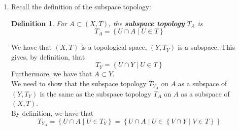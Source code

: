 \documentclass{article}
\newcommand{\sth}{\mathrm{s.th}\ }
\newcommand{\R}{\mathbb{R}}
\newcommand{\cts}{cts. }
\newcommand{\ba}{\mathcal{B}}
\newtheorem{sdefinition}[stheorem]{Definition}
\theoremstyle{remark}
\theoremstyle{example}
\theoremstyle{examples}
\begin{document}
\begin{enumerate}
\begin{enumerate}
			\item Recall the definition of continuity in this context:
			\begin{framed}
				\setcounter{theorem}{3}
				\setcounter{stheorem}{0}
				\begin{sdefinition}
					A map $f:(X,T) \to (Y, T')$ is \textbf{continuous} if $\forall V \in T'$ the pre-image $f^{-1}(V) \in T$
				\end{sdefinition}
			\end{framed}We have $T_\ba$ as follows: \[T_\ba=\left\{ I \subset \R \mid \forall x \in I , \exists B_x \in \ba\ \sth x \in B_x \subset I\right\}=\left\{ (a, \infty) , a \in \R \right\}\]
			\begin{enumerate}
				\item Let $V=(0,\infty) \in T_\ba$. Then $f^{-1}(V)=\{x:x^2 \in V\} = \{x \in \R : x^2 > 0\}=\R \setminus \{0\} \notin T_\ba$.\\
				$\therefore f$ is not \cts.
				\item Let $V=(a,\infty) \in T_\ba$.\\
				Then $g^{-1}(V)=\{x:e^x \in V\}=\{x \in \R: e^x > a\}=(\ln(\min\{0,a\}), \infty)$.\\
				So for any $a$ (i.e. for any $V \in T_\ba$), we have $g^{-1}(V)$ is the interval $(\ln(\min\{0,a\}),\infty) \in T_\ba$.\\
				$\therefore g$ is \cts.
			\end{enumerate}
		\end{enumerate}
		\pagebreak
		\item Recall the definition of the subspace topology:
		\begin{framed}
			\setcounter{section}{3}
			\setcounter{theorem}{1}
			\setcounter{stheorem}{0}
			\begin{sdefinition}
				For $A \subset (X,T)$, the \textbf{subspace topology} $T_A$ is \[T_A  = \left\{ U \cap A \mid U \in T \right\} \]
			\end{sdefinition}
		\end{framed}
		We have that $(X,T)$ is a topological space, $(Y,T_Y)$ is a subspace. This gives, by definition, that \[ T_Y = \left\{ U \cap Y \mid U \in T \right\} \]
		Furthermore, we have that $A \subset Y$.\\
		We need to show that the subspace topology $T_{Y_A}$ on $A$ as a subspace of $(Y,T_Y)$ is the same as the subspace topology $T_A$ on $A$ as a subspace of $(X,T)$.\\
		By definition, we have that \[T_{Y_A} = \left\{ U \cap A \mid U \in T_Y \right\} = \left\{ U \cap A \mid U \in \left\{ V \cap Y \mid V \in T \right\} \right\} \]

\end{enumerate}
\end{document}
